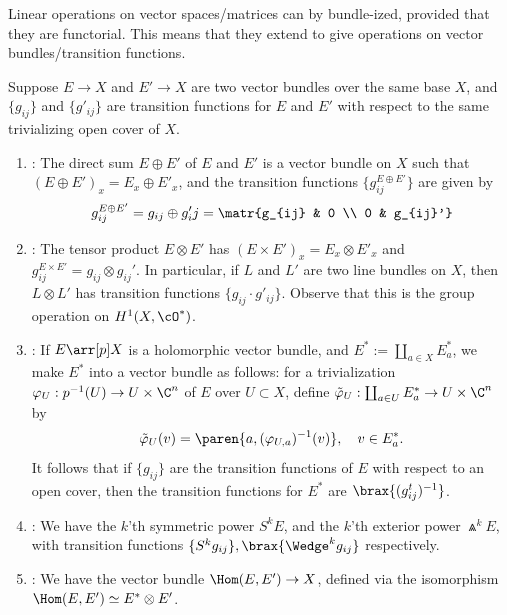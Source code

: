 \documentclass[11pt]{report}
\begin{document}
Linear operations on vector spaces/matrices can by bundle-ized, provided that they are functorial. This means that they extend to give operations on vector bundles/transition functions.

\begin{ex}
    Suppose $E \to X$ and $E' \to X$ are two vector bundles over the same base $X$, and $\{g_{ij}\}$ and $\{g'_{ij}\}$ are transition functions for $E$ and $E'$ with respect to the same trivializing open cover of $X$.
    \begin{enumerate}
        \item {}: The direct sum $E \oplus E'$ of $E$ and $E'$ is a vector bundle on $X$ such that $(E \oplus E')_x = E_x \oplus E'_x$, and the transition functions $\{g_{ij}^{E \oplus E'} \}$ are given by \[
        g_{ij}^{E \oplus E'} = g_{ij} \oplus g'_ij = \matr{g_{ij} & 0 \\ 0 & g_{ij}'}
        \]
        \item {}: The tensor product $E \otimes E'$ has $(E \times E')_x = E_x\otimes E'_x$ and $g_{ij}^{E \times E'}=g_{ij} \otimes g_{ij}'$. In particular, if $L$ and $L'$ are two line bundles on $X$, then $L \otimes L'$ has transition functions $\{g_{ij}\cdot g'_{ij}\}$. Observe that this is the group operation on $H^1(X,\cO^*)$.
        \item {}: If $E \arr[p] X$ is a holomorphic vector bundle, and $E^*:= \coprod_{a \in X}E_a^*$, we make $E^*$ into a vector bundle as follows: for a trivialization $\varphi_U:p^{-1}(U) \to U \times \C^n$ of $E$ over $U \subset X$, define $\tilde \varphi_U :\coprod_{a \in U}E_a^* \to U \times \C^n$ by 
        \[
        \tilde \varphi_U(v) = \paren{ a, (\varphi_{U,a})^{-1}(v)}, \quad v \in E_a^*.
        \] 
        It follows that if $\{g_{ij}\}$ are the transition functions of $E$ with respect to an open cover, then the transition functions for $E^*$ are $\brax{ (g_{ij}^t)^{-1} }$.
        \item {}: We have the $k$'th symmetric power $S^kE$, and the $k$'th exterior power $\Wedge^kE$, with transition functions $\{S^kg_{ij}\},\brax{\Wedge ^kg_{ij}}$ respectively.
        \item {}: We have the vector bundle $\Hom(E,E')\to X$, defined via the isomorphism $\Hom(E,E') \simeq E^* \otimes E'$.
    \end{enumerate}
\end{ex}
\end{document}
